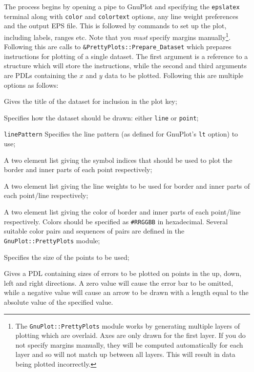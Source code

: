 The process begins by opening a pipe to {\sc GnuPlot} and specifying the {\tt epslatex} terminal along with {\tt color} and {\tt colortext} options, any line weight preferences and the output EPS file. This is followed by commands to set up the plot, including labels, ranges etc. Note that you \emph{must} specify margins manually\footnote{The {\tt GnuPlot::PrettyPlots} module works by generating multiple layers of plotting which are overlaid. Axes are only drawn for the first layer. If you do not specify margins manually, they will be computed automatically for each layer and so will not match up between all layers. This will result in data being plotted incorrectly.}. Following this are calls to {\tt \&PrettyPlots::Prepare\_Dataset} which prepares instructions for plotting of a single dataset. The first argument is a reference to a structure which will store the instructions, while the second and third arguments are PDLs containing the $x$ and $y$ data to be plotted. Following this are multiple options as follows:
\begin{description}
\item[{\tt title}] Gives the title of the dataset for inclusion in the plot key;
\item[{\tt style}] Specifies how the dataset should be drawn: either {\tt line} or {\tt point};
\item{{\tt linePattern}} Specifies the line pattern (as defined for {\sc GnuPlot}'s {\tt lt} option) to use;
\item[{\tt symbol}] A two element list giving the symbol indices that should be used to plot the border and inner parts of each point respectively;
\item[{\tt weight}] A two element list giving the line weights to be used for border and inner parts of each point/line respectively;
\item[{\tt color}] A two element list giving the color of border and inner parts of each point/line respectively. Colors should be specified as {\tt \#RRGGBB} in hexadecimal. Several suitable color pairs and sequences of pairs are defined in the {\tt GnuPlot::PrettyPlots} module;
\item[{\tt pointSize}] Specifies the size of the points to be used;
\item[{\tt errorNNN}] Gives a PDL containing sizes of errors to be plotted on points in the up, down, left and right directions. A zero value will cause the error bar to be omitted, while a negative value will cause an arrow to be drawn with a length equal to the absolute value of the specified value.
\end{description}
